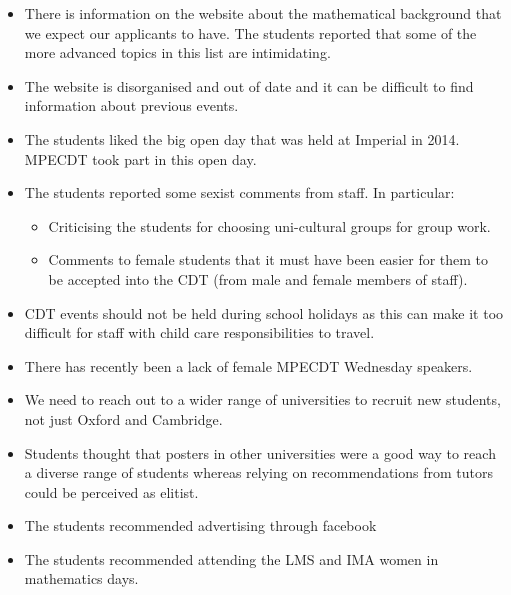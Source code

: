 \documentclass[12pt]{article}
\begin{document}
\begin{itemize}
\item There is information on the website about the mathematical background that we expect our applicants to have. The students reported that some of the more advanced topics in this list are intimidating.
\item The website is disorganised and out of date and it can be difficult to find information about previous events.
\item The students liked the big open day that was held at Imperial in 2014. MPECDT took part in this open day.
\item The students reported some sexist comments from staff. In particular:
\begin{itemize}
\item Criticising the students for choosing uni-cultural groups for group work.
\item Comments to female students that it must have been easier for them to be accepted into the CDT (from male and female members of staff).
\end{itemize}
\item CDT events should not be held during school holidays as this can make it too difficult for staff with child care responsibilities to travel. 
\item There has recently been a lack of female MPECDT Wednesday speakers.
\item We need to reach out to a wider range of universities to recruit new students, not just Oxford and Cambridge.
\item Students thought that posters in other universities were a good way to reach a diverse range of students whereas relying on recommendations from tutors could be perceived as elitist. 
\item The students recommended advertising through facebook
\item The students recommended attending the LMS and IMA women in mathematics days.
\end{itemize}
\end{document}
